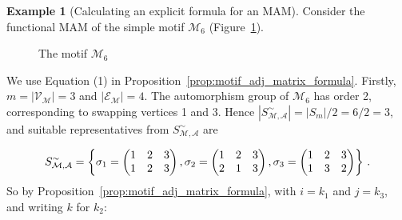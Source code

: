 \documentclass[12pt,draft]{ociamthesis}
\theoremstyle{plain}
\theoremstyle{definition}
\newtheorem{example}{Example}[chapter]
\theoremstyle{remark}
\newcommand\ca[1]{\mathcal{#1}}
\begin{document}
\pagebreak

\begin{example}[Calculating an explicit formula for an MAM]
\label{ex:motif_adj_calc}
Consider the functional MAM of the simple motif $\ca{M}_6$
(Figure~\ref{fig:M6}).
%
\begin{figure}[H]
\centering
\caption{The motif $\ca{M}_6$}
\label{fig:M6}
\end{figure}
%
We use Equation (1) in Proposition~\ref{prop:motif_adj_matrix_formula}.
Firstly, $m = |\ca{V_M}| = 3$ and $|\ca{E_M}| = 4$. The automorphism group of
$\ca{M}_6$ has order 2, corresponding to swapping vertices 1 and 3. Hence
$|S_\ca{M,A}^\sim| = |S_m| / 2 = 6/2 = 3$, and suitable representatives from
$S_\ca{M,A}^\sim$ are

$$ S_\ca{M,A}^\sim = \left\{
%
\sigma_1 =
\begin{pmatrix}
1 & 2 & 3 \\
1 & 2 & 3
\end{pmatrix},
%
\sigma_2 =
\begin{pmatrix}
1 & 2 & 3 \\
2 & 1 & 3
\end{pmatrix},
%
\sigma_3 =
\begin{pmatrix}
1 & 2 & 3 \\
1 & 3 & 2
\end{pmatrix}
\right\}\,. \vspace*{0.2cm}$$
%
So by Proposition~\ref{prop:motif_adj_matrix_formula}, with $i=k_1$ and
$j=k_3$, and writing $k$ for $k_2$:


\end{example}
\end{document}
